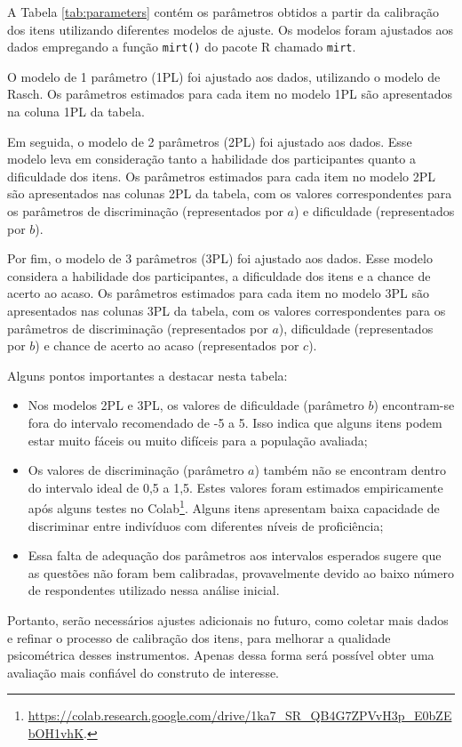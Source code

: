 A Tabela \ref{tab:parameters} contém os parâmetros obtidos a partir da calibração dos itens utilizando diferentes modelos de ajuste. Os modelos foram ajustados aos dados empregando a função \verb|mirt()| do pacote R chamado \verb|mirt|.

O modelo de 1 parâmetro (1PL) foi ajustado aos dados, utilizando o modelo de Rasch. Os parâmetros estimados para cada item no modelo 1PL são apresentados na coluna 1PL da tabela.

Em seguida, o modelo de 2 parâmetros (2PL) foi ajustado aos dados. Esse modelo leva em consideração tanto a habilidade dos participantes quanto a dificuldade dos itens. Os parâmetros estimados para cada item no modelo 2PL são apresentados nas colunas 2PL da tabela, com os valores correspondentes para os parâmetros de discriminação (representados por $a$) e dificuldade (representados por $b$).

Por fim, o modelo de 3 parâmetros (3PL) foi ajustado aos dados. Esse modelo considera a habilidade dos participantes, a dificuldade dos itens e a chance de acerto ao acaso. Os parâmetros estimados para cada item no modelo 3PL são apresentados nas colunas 3PL da tabela, com os valores correspondentes para os parâmetros de discriminação (representados por $a$), dificuldade (representados por $b$) e chance de acerto ao acaso (representados por $c$).

Alguns pontos importantes a destacar nesta tabela:
\begin{itemize}
    \item Nos modelos 2PL e 3PL, os valores de dificuldade (parâmetro $b$) encontram-se fora do intervalo recomendado de -5 a 5. Isso indica que alguns itens podem estar muito fáceis ou muito difíceis para a população avaliada;
    \item Os valores de discriminação (parâmetro $a$) também não se encontram dentro do intervalo ideal de 0,5 a 1,5. Estes valores foram estimados empiricamente após alguns testes no Colab\footnote{\url{https://colab.research.google.com/drive/1ka7_SR_QB4G7ZPVvH3p_E0bZEbOH1vhK}.}. Alguns itens apresentam baixa capacidade de discriminar entre indivíduos com diferentes níveis de proficiência;
    \item Essa falta de adequação dos parâmetros aos intervalos esperados sugere que as questões não foram bem calibradas, provavelmente devido ao baixo número de respondentes utilizado nessa análise inicial.
\end{itemize}
Portanto, serão necessários ajustes adicionais no futuro, como coletar mais dados e refinar o processo de calibração dos itens, para melhorar a qualidade psicométrica desses instrumentos. Apenas dessa forma será possível obter uma avaliação mais confiável do construto de interesse.

